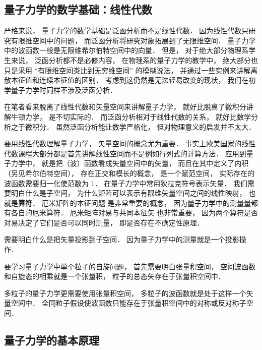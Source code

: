 
\begin{issues}
\issueTODO
\end{issues}

\subsection{量子力学的数学基础：线性代数}
严格来说， 量子力学的数学基础是泛函分析而不是线性代数． 因为线性代数只研究有限维空间中的问题， 而泛函分析将研究对象拓展到了无限维空间． 量子力学中的波函数一般是无限维希尔伯特空间中的向量． 但是， 对于绝大部分物理系学生来说， 泛函分析都不是必修内容， 在物理系的量子力学的教学中， 绝大部分也只是采用 “有限维空间类比到无穷维空间” 的模糊说法， 并通过一些实例来讲解离散本征值和连续本征值的区别． 考虑到这仍然是无法轻易改变的现状， 我们在初学量子力学时同样不涉及泛函分析．

在笔者看来脱离了线性代数和矢量空间来讲解量子力学， 就好比脱离了微积分讲解牛顿力学， 是不切实际的． 而泛函分析相对于线性代数的关系， 就好比数学分析之于微积分． 虽然泛函分析能让数学严格化， 但对物理意义的启发并不太大．

要用线性代数理解量子力学， 矢量空间的概念尤为重要． 事实上欧美国家的线性代数课程大部分都是首先讲解线性空间而不是例如行列式的计算方法． 应用到量子力学中， 就是把（波）函数看成矢量空间中的矢量， 而且在其中定义了内积（另见希尔伯特空间）， 存在正交和模长的概念， 是一个赋范空间， 实际存在的波函数需要归一化使范数为 1． 在量子力学中常用狄拉克符号表示矢量． 我们需要明白什么是子空间， 为什么矩阵可以表示有限维矢量空间之间的线性映射， 也就是\textbf{算符}． 厄米矩阵的本征问题 是非常重要的概念， 因为量子力学中的测量量都有各自的厄米算符． 厄米矩阵对易与共同本征矢 也非常重要， 因为两个算符是否对易决定了它们是否可以同时测量， 即是否存在不确定性原理．

需要明白什么是把矢量投影到子空间． 因为量子力学中的测量就是一个投影操作．

要学习量子力学中单个粒子的自旋问题， 首先需要明白张量积空间， 空间波函数和自旋态的相乘就是一个张量积， 粒子的总态矢存在于张量积空间中．

多粒子的量子力学更需要使用张量积空间， 多粒子的波函数就是处于这样一个矢量空间中． 全同粒子假设使波函数只能存在于张量积空间中的对称或反对称子空间．

\subsection{量子力学的基本原理}

